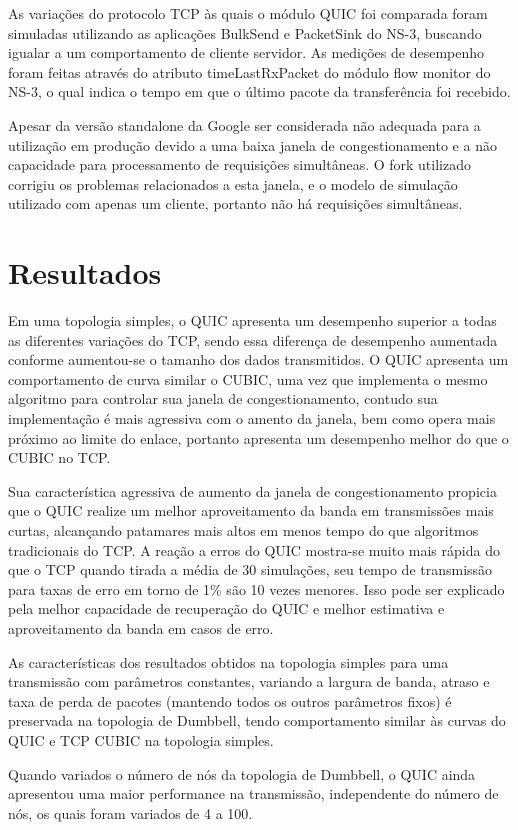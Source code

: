 \documentclass{article}
\begin{document}
As variações do protocolo TCP às quais o módulo QUIC foi comparada foram simuladas utilizando as aplicações BulkSend e
PacketSink do NS-3, buscando igualar a um comportamento de cliente servidor. As medições de desempenho foram feitas
através do atributo timeLastRxPacket do módulo flow monitor do NS-3, o qual indica o tempo em que o último pacote da
transferência foi recebido.

Apesar da versão standalone da Google ser considerada não adequada para a utilização em produção devido a uma baixa
janela de congestionamento e a não capacidade para processamento de requisições simultâneas. O fork utilizado corrigiu
os problemas relacionados a esta janela, e o modelo de simulação utilizado com apenas um cliente, portanto não há
requisições simultâneas.

\section{Resultados}
Em uma topologia simples, o QUIC apresenta um desempenho superior a todas as diferentes variações do TCP, sendo essa
diferença de desempenho aumentada conforme aumentou-se o tamanho dos dados transmitidos. O QUIC apresenta um
comportamento de curva similar o CUBIC, uma vez que implementa o mesmo algoritmo para controlar sua janela de
congestionamento, contudo sua implementação é mais agressiva com o amento da janela, bem como opera mais próximo ao
limite do enlace, portanto apresenta um desempenho melhor do que o CUBIC no TCP.

Sua característica agressiva de aumento da janela de congestionamento propicia que o QUIC realize um melhor
aproveitamento da banda em transmissões mais curtas, alcançando patamares mais altos em menos tempo do que algoritmos
tradicionais do TCP. A reação a erros do QUIC mostra-se muito mais rápida do que o TCP quando tirada a média de 30
simulações, seu tempo de transmissão para taxas de erro em torno de 1\% são 10 vezes menores. Isso pode ser explicado
pela melhor capacidade de recuperação do QUIC e melhor estimativa e aproveitamento da banda em casos de erro.


As características dos resultados obtidos na topologia simples para uma transmissão com parâmetros constantes, variando
a largura de banda, atraso e taxa de perda de pacotes (mantendo todos os outros parâmetros fixos) é preservada na
topologia de Dumbbell, tendo comportamento similar às curvas do QUIC e TCP CUBIC na topologia simples.

Quando variados o número de nós da topologia de Dumbbell, o QUIC ainda apresentou uma maior performance na transmissão,
independente do número de nós, os quais foram variados de 4 a 100.
\end{document}
